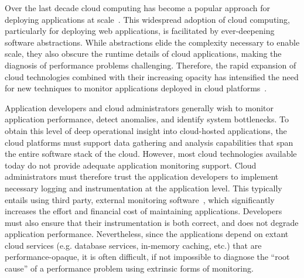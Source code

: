 Over the last decade cloud computing has become a popular approach for deploying
applications at scale~\cite{Antonopoulos:2010:CCP:1855007,Pinheiro:2014:ACC:2618168.2618188}. 
This widespread adoption of cloud computing, particularly for deploying
web applications, is facilitated by ever-deepening software abstractions.
While abstractions elide the complexity necessary to enable scale,
they also obscure the runtime details of cloud applications, 
making the diagnosis of performance problems challenging.
Therefore, the rapid expansion of cloud technologies
combined with their increasing opacity has intensified the need 
for new techniques to
monitor applications deployed in cloud platforms~\cite{DaCunhaRodrigues:2016:MCC:2851613.2851619}. 

Application developers and cloud administrators generally wish to monitor 
application performance, detect anomalies, and identify system bottlenecks. To obtain 
this level of deep operational insight into cloud-hosted applications, the cloud platforms must support 
data gathering and analysis capabilities that span the entire software stack of the cloud. 
However, most cloud technologies available
today do not provide adequate application monitoring support. Cloud administrators must therefore trust the
application developers to implement necessary logging and instrumentation 
at the application level. This typically entails using third party, external monitoring software~\cite{newrelic,datadog,dynatrace},
which significantly increases the effort and financial cost of maintaining applications.
Developers must also ensure
that their instrumentation is both correct, and does not degrade 
application performance.  Nevertheless, since the applications depend on extant
cloud services (e.g. database services, 
in-memory caching, etc.) that are performance-opaque, it is
often difficult, if not impossible to diagnose the ``root cause'' of a performance problem
using extrinsic forms of monitoring.

